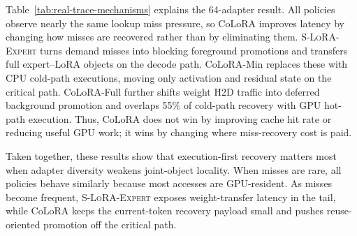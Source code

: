 \documentclass[sigplan,anonymous,review,10pt]{acmart}
\begin{document}
Table~\ref{tab:real-trace-mechanisms} explains the 64-adapter result. All policies observe nearly the same lookup miss pressure, so CoLoRA improves latency by changing how misses are recovered rather than by eliminating them. \textsc{S-LoRA-Expert} turns demand misses into blocking foreground promotions and transfers full expert--LoRA objects on the decode path. CoLoRA-Min replaces these with CPU cold-path executions, moving only activation and residual state on the critical path. CoLoRA-Full further shifts weight H2D traffic into deferred background promotion and overlaps 55\% of cold-path recovery with GPU hot-path execution. Thus, CoLoRA does not win by improving cache hit rate or reducing useful GPU work; it wins by changing where miss-recovery cost is paid.

Taken together, these results show that execution-first recovery matters most when adapter diversity weakens joint-object locality. When misses are rare, all policies behave similarly because most accesses are GPU-resident. As misses become frequent, \textsc{S-LoRA-Expert} exposes weight-transfer latency in the tail, while CoLoRA keeps the current-token recovery payload small and pushes reuse-oriented promotion off the critical path.


\end{document}
